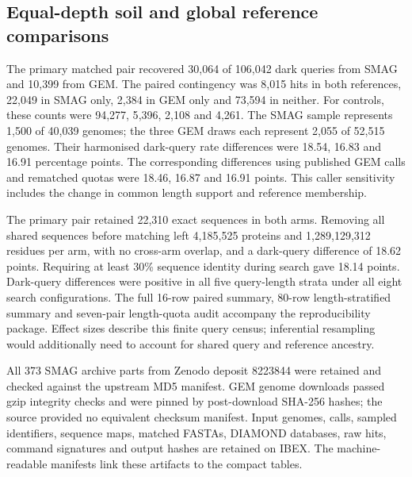 \subsection*{Equal-depth soil and global reference comparisons}
The primary matched pair recovered 30{,}064 of 106{,}042 dark queries from SMAG and 10{,}399
from GEM. The paired contingency was 8{,}015 hits in both references, 22{,}049 in SMAG only,
2{,}384 in GEM only and 73{,}594 in neither. For controls, these counts were 94{,}277,
5{,}396, 2{,}108 and 4{,}261. The SMAG sample represents 1{,}500 of 40{,}039 genomes;
the three GEM draws each represent 2{,}055 of 52{,}515 genomes. Their harmonised dark-query
rate differences were 18.54, 16.83 and 16.91 percentage points. The corresponding differences
using published GEM calls and rematched quotas were 18.46, 16.87 and 16.91 points.
This caller sensitivity includes the change in common length support and reference membership.

The primary pair retained 22{,}310 exact sequences in both arms. Removing all shared sequences
before matching left 4{,}185{,}525 proteins and 1{,}289{,}129{,}312 residues per arm, with no
cross-arm overlap, and a dark-query difference of 18.62 points. Requiring at least 30\%
sequence identity during search gave 18.14 points. Dark-query differences were positive in
all five query-length strata under all eight search configurations. The full 16-row paired
summary, 80-row length-stratified summary and seven-pair length-quota audit accompany the
reproducibility package. Effect sizes describe this finite query census; inferential
resampling would additionally need to account for shared query and reference ancestry.

All 373 SMAG archive parts from Zenodo deposit 8223844 were retained and checked against the
upstream MD5 manifest. GEM genome downloads passed gzip integrity checks and were pinned by
post-download SHA-256 hashes; the source provided no equivalent checksum manifest.
Input genomes, calls, sampled identifiers, sequence maps, matched FASTAs, DIAMOND databases,
raw hits, command signatures and output hashes are retained on IBEX. The machine-readable
manifests link these artifacts to the compact tables.
